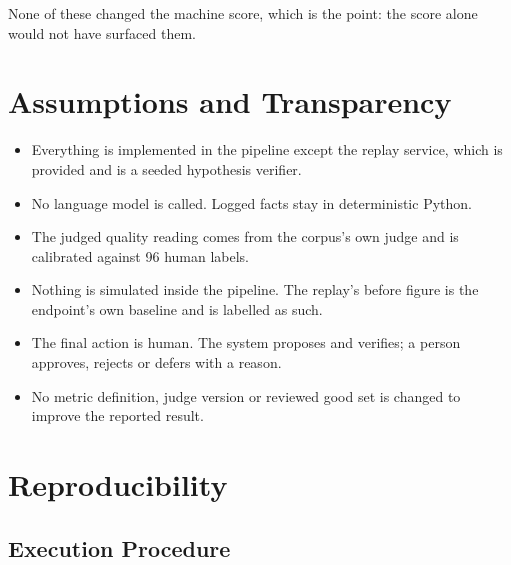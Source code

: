 \documentclass[8pt,twocolumn,a4paper]{extarticle}
\begin{document}
None of these changed the machine score, which is the point: the score
alone would not have surfaced them.


\section{Assumptions and Transparency}

\begin{itemize}
    \item Everything is implemented in the pipeline except the replay
    service, which is provided and is a seeded hypothesis verifier.
    \item No language model is called. Logged facts stay in deterministic
    Python.
    \item The judged quality reading comes from the corpus's own judge
    and is calibrated against 96 human labels.
    \item Nothing is simulated inside the pipeline. The replay's before
    figure is the endpoint's own baseline and is labelled as such.
    \item The final action is human. The system proposes and verifies; a
    person approves, rejects or defers with a reason.
    \item No metric definition, judge version or reviewed good set is
    changed to improve the reported result.
\end{itemize}


\section{Reproducibility}

\subsection{Execution Procedure}
\end{document}
